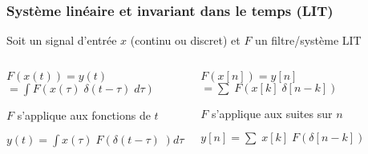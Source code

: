 \documentclass{beamer}
\begin{document}
\begin{frame} 
\frametitle{Système linéaire et invariant dans le temps (LIT) }
Soit un signal d'entrée $x$ (continu ou discret) et $F$ un filtre/système LIT\\
\vspace{1 cm}
\begin{columns}
\column{65mm}
\begin{center}
$F(x(t)) = y(t) $\\
$= \displaystyle \int F (x(\tau) \; \delta(t-\tau) \; d\tau)$\\
\vspace{0.5cm}

$F$ s'applique aux fonctions de $t$\\
\vspace{0.5cm}

$y(t) = \displaystyle \int x(\tau) \; F(\delta(t-\tau) \; )d\tau$\\
\vspace{0.5cm}

\end{center}

\column{55mm}
\begin{center}
$F(x[n]) = y[n] $\\
$ = \displaystyle \sum \; F( x[k] \; \delta[n-k]) $ \\
\vspace{0.5cm}

$F$ s'applique aux suites sur $n$\\
\vspace{0.5cm}

$ y[n] = \displaystyle \sum \; x[k] \;  F(\delta[n-k]) $ \\
\vspace{0.5cm}


\end{center}
\end{columns}
\end{frame}
\end{document}
